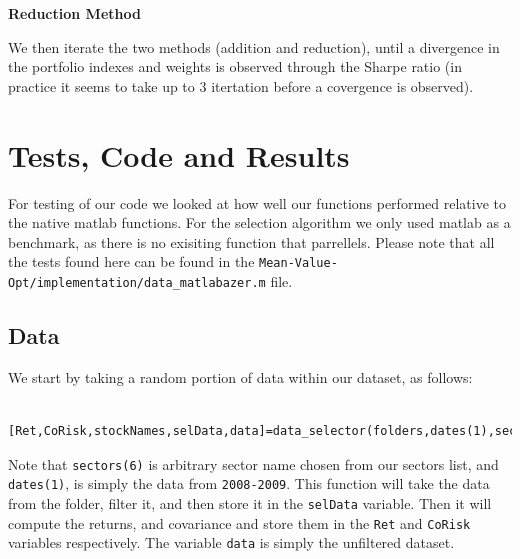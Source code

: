 \documentclass[12pt,titlepage,a4paper]{article}
\begin{document}
		\begin{center}
		\textbf{Reduction Method}\par\medskip
		\end{center}
		We then iterate the two methods (addition and reduction), until a divergence in the portfolio indexes and weights is observed through the Sharpe ratio (in practice it seems to take up to 3 itertation before a covergence is observed).

\section{Tests, Code and Results}

	\begin{par}
		For testing of our code we looked at how well our functions performed relative to the native matlab functions. For the selection algorithm we only used matlab as a benchmark, as there is no exisiting function that parrellels. Please note that all the tests found here can be found in the \texttt{Mean-Value-Opt/implementation/data\_matlabazer.m} file.
	\end{par} \vspace{1em}

	\subsection*{Data}

	\begin{par}
		We start by taking a random portion of data within our dataset, as follows:
	\end{par}
	\begin{verbatim}
		[Ret,CoRisk,stockNames,selData,data]=data_selector(folders,dates(1),sectors(6));
	\end{verbatim}
	\begin{par}
		Note that \texttt{sectors(6)} is arbitrary sector name chosen from our sectors list, and \texttt{dates(1)}, is simply the data from \texttt{2008-2009}. This function will take the data from the folder, filter it, and then store it in the \texttt{selData} variable. Then it will compute the returns, and covariance and store them in the \texttt{Ret} and \texttt{CoRisk} variables respectively. The variable \texttt{data} is simply the unfiltered dataset.
	\end{par} \vspace{1em}
\end{document}
